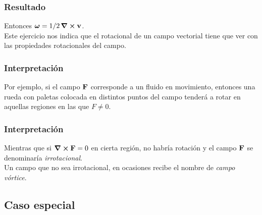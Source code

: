 \documentclass[12pt]{beamer}
\begin{document}
\begin{frame}
\frametitle{Resultado}
Entonces $\bm{\omega} = 1/2 \, \curl{\vb{v}}$.
\\
\bigskip
\pause
Este ejercicio nos indica que el rotacional de un campo vectorial tiene que ver con las propiedades rotacionales del campo.
\end{frame}
\begin{frame}
\frametitle{Interpretación}
Por ejemplo, si el campo $\vb{F}$ corresponde a un fluido en movimiento, entonces una rueda con paletas colocada en distintos puntos del campo tenderá a rotar en aquellas regiones en las que $F \neq 0$.
\end{frame}
\begin{frame}
\frametitle{Interpretación}
Mientras que si $\curl{\vb{F}} = 0$ en cierta región, no habría rotación y el campo $\vb{F}$ se denominaría \emph{irrotacional}.
\\
\bigskip
\pause
Un campo que no sea irrotacional, en ocasiones recibe el nombre de \emph{campo vórtice}.
\end{frame}

\subsection{Caso especial}
\end{document}
